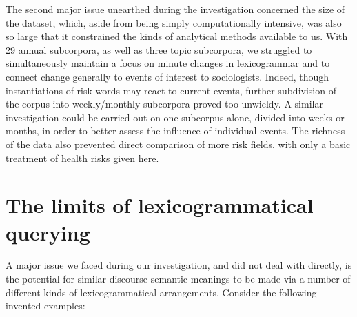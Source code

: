 	The second major issue unearthed during the investigation concerned the size of the dataset, which, aside from being simply computationally intensive, was also so large that it constrained the kinds of analytical methods available to us. With 29 annual subcorpora, as well as three topic subcorpora, we struggled to simultaneously maintain a focus on minute changes in lexicogrammar and to connect change generally to events of interest to sociologists. Indeed, though instantiations of risk words may react to current events, further subdivision of the corpus into weekly/monthly subcorpora proved too unwieldy. A similar investigation could be carried out on one subcorpus alone, divided into weeks or months, in order to better assess the influence of individual events. The richness of the data also prevented direct comparison of more risk fields, with only a basic treatment of health risks given here. 

    \section{The limits of lexicogrammatical querying}

        A major issue we faced during our investigation, and did not deal with directly, is the potential for similar discourse-semantic meanings to be made via a number of different kinds of lexicogrammatical arrangements. Consider the following invented examples:

